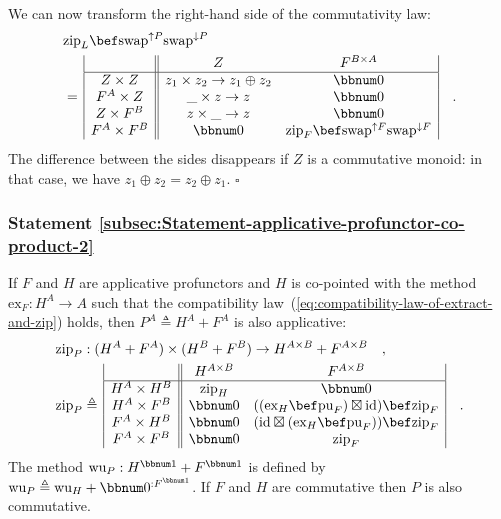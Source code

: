 We can now transform the right-hand side of the commutativity law:
\begin{align*}
 & \text{zip}_{L}\bef\text{swap}^{\uparrow P}\text{swap}^{\downarrow P}\\
 & =\,\begin{array}{|c||cc|}
 & Z & F^{B\times A}\\
\hline Z\times Z & z_{1}\times z_{2}\rightarrow z_{1}\oplus z_{2} & \bbnum 0\\
F^{A}\times Z & \_\times z\rightarrow z & \bbnum 0\\
Z\times F^{B} & z\times\_\rightarrow z & \bbnum 0\\
F^{A}\times F^{B} & \bbnum 0 & \text{zip}_{F}\bef\text{swap}^{\uparrow F}\text{swap}^{\downarrow F}
\end{array}\quad.
\end{align*}
The difference between the sides disappears if $Z$ is a commutative
monoid: in that case, we have $z_{1}\oplus z_{2}=z_{2}\oplus z_{1}$.
$\square$

\subsubsection{Statement \label{subsec:Statement-applicative-profunctor-co-product-2}\ref{subsec:Statement-applicative-profunctor-co-product-2}}

If $F$ and $H$ are applicative profunctors and $H$ is co-pointed
with the method $\text{ex}_{F}:H^{A}\rightarrow A$ such that the
compatibility law~(\ref{eq:compatibility-law-of-extract-and-zip})
holds, then $P^{A}\triangleq H^{A}+F^{A}$ is also applicative:
\begin{align*}
 & \text{zip}_{P}:(H^{A}+F^{A})\times(H^{B}+F^{B})\rightarrow H^{A\times B}+F^{A\times B}\quad,\\
 & \text{zip}_{P}\triangleq\,\begin{array}{|c||cc|}
 & H^{A\times B} & F^{A\times B}\\
\hline H^{A}\times H^{B} & \text{zip}_{H} & \bbnum 0\\
H^{A}\times F^{B} & \bbnum 0 & ((\text{ex}_{H}\bef\text{pu}_{F})\boxtimes\text{id})\bef\text{zip}_{F}\\
F^{A}\times H^{B} & \bbnum 0 & (\text{id}\boxtimes(\text{ex}_{H}\bef\text{pu}_{F}))\bef\text{zip}_{F}\\
F^{A}\times F^{B} & \bbnum 0 & \text{zip}_{F}
\end{array}\quad.
\end{align*}
The method $\text{wu}_{P}:H^{\bbnum 1}+F^{\bbnum 1}$ is defined by
$\text{wu}_{P}\triangleq\text{wu}_{H}+\bbnum 0^{:F^{\bbnum 1}}$.
If $F$ and $H$ are commutative then $P$ is also commutative.

